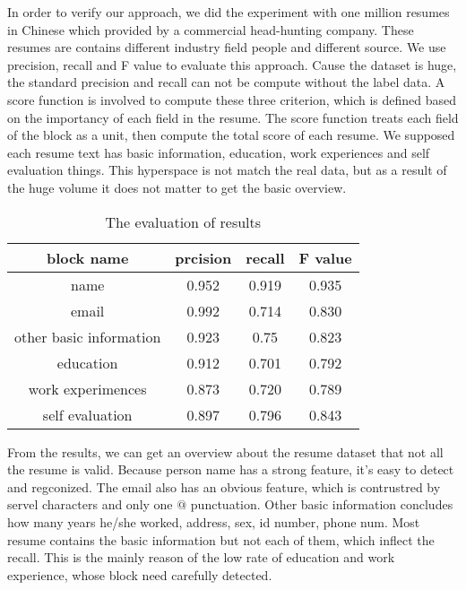 \documentclass{acm_proc_article-sp}
\begin{document}
In order to verify our approach, we did the experiment with one million resumes in Chinese which provided by a commercial head-hunting company. 
These resumes are contains different industry field people and different source.
We use precision, recall and F value to evaluate this approach.
Cause the dataset is huge, the standard precision and recall can not be compute without the label data.
A score function is involved to compute these three criterion, which is defined based on the importancy of each field in the resume. 
The score function treats each field of the block as a unit, then compute the total score of each resume. 
We supposed each resume text has basic information, education, work experiences and self evaluation things.
This hyperspace is not match the real data, but as a result of the huge volume it does not matter to get the basic overview.

\begin{table}
\centering
\caption{The evaluation of results}
\begin{tabular}{|c|c|c|c|} \hline
block name & prcision & recall & F value\\ \hline
name & 0.952 & 0.919 & 0.935 \\ \hline
email & 0.992 & 0.714 &0.830 \\  \hline
other basic information & 0.923 & 0.75 & 0.823 \\ \hline
education & 0.912 & 0.701 & 0.792\\ \hline
work experimences & 0.873  & 0.720 & 0.789 \\ \hline
self evaluation & 0.897  &0.796 &0.843 \\
\hline\end{tabular}
\end{table}

From the results, we can get an overview about the resume dataset that not all the resume is valid.
Because person name has a strong feature, it's easy to detect and regconized.
The email also has an obvious feature, which is contrustred by servel characters and only one $@$ punctuation.
Other basic information concludes how many years he/she worked, address, sex, id number, phone num.
Most resume contains the basic information but not each of them, which inflect the recall.
This is the mainly reason of the low rate of education and work experience, whose block need carefully detected.
\end{document}

